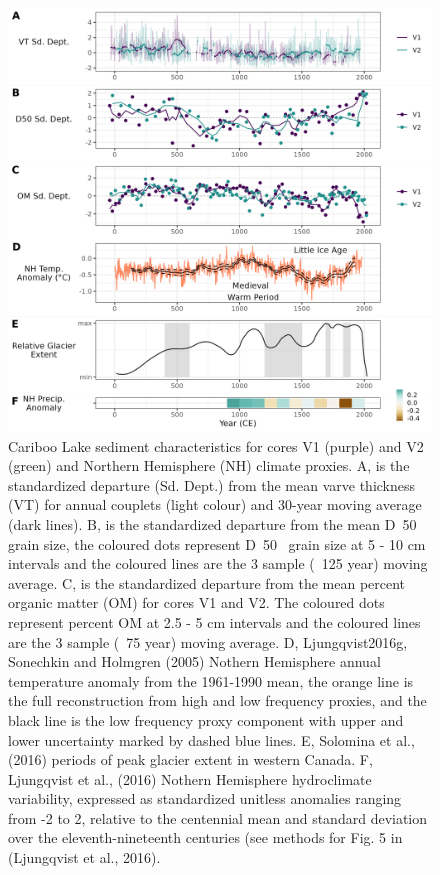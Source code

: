 \documentclass[Royal,times,doublespace,sageh]{sagej}
\begin{document}
\begin{figure}

{\centering \includegraphics[width=1\linewidth]{figs/all_core_stats_2k_anomalies} 

}

\caption{Cariboo Lake sediment characteristics for cores V1 (purple) and V2 (green) and Northern Hemisphere (NH) climate proxies. A, is the standardized departure (Sd. Dept.) from the mean varve thickness (VT) for annual couplets (light colour) and 30-year moving average (dark lines). B, is the standardized departure from the mean D~50~ grain size, the coloured dots represent D~50~ grain size at 5 - 10 cm intervals and the coloured lines are the 3 sample (~125 year) moving average. C, is the standardized departure from the mean percent organic matter (OM) for cores V1 and V2. The coloured dots represent percent OM at 2.5 - 5 cm intervals and the coloured lines are the 3 sample (~75 year) moving average. D, Ljungqvist2016g, Sonechkin and Holmgren (2005) Nothern Hemisphere annual temperature anomaly from the 1961-1990 mean, the orange line is the full reconstruction from high and low frequency proxies, and the black line is the low frequency proxy component with upper and lower uncertainty marked by dashed blue lines. E, Solomina et al., (2016) periods of peak glacier extent in western Canada. F, Ljungqvist et al., (2016) Nothern Hemisphere hydroclimate variability, expressed as standardized unitless anomalies ranging from -2 to 2, relative to the centennial mean and standard deviation over the eleventh-nineteenth centuries (see methods for Fig. 5 in (Ljungqvist et al., 2016).}\label{fig:proxy-comparison}
\end{figure}
\end{document}
